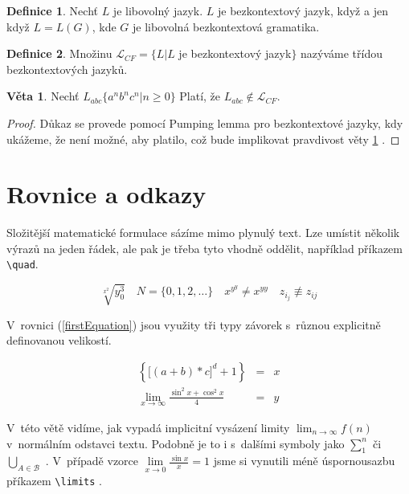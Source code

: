 \documentclass[a4paper, 11pt]{article}
\theoremstyle{definition}
\newtheorem{definition}{Definice}[section]
\theoremstyle{theorem}
\newtheorem{veta}{Věta}
\begin{document}
\begin{definition}
Nechť $L$ je libovolný jazyk. $L$ je bezkontextový jazyk, když a jen když $L=L(G)$, kde $G$ je libovolná bezkontextová gramatika.
\end{definition}

\begin{definition}
Množinu $\mathcal{L}_{CF}=\{L|L$ je bezkontextový jazyk$\}$ nazýváme třídou bezkontextových jazyků.
\end{definition}

\begin{veta}
\label{firstVeta}
Nechť $L_{abc} \{ a^nb^nc^n | n \geq 0 \}$  Platí, že  $L_{abc} \not\in \mathcal{L}_{CF}$.
\end{veta}

\begin{proof}
Důkaz se provede pomocí Pumping lemma pro bezkontextové jazyky, kdy ukážeme, že není možné, aby platilo, což bude implikovat pravdivost věty \ref{firstVeta} .
\end{proof}

\section{Rovnice a odkazy}

Složitější matematické formulace sázíme mimo plynulý text. Lze umístit několik výrazů na jeden řádek, ale pak je třeba tyto vhodně oddělit, například příkazem \verb!\quad!.

$$
\sqrt[x^2]{y_0^3}\quad{N} =\{0,1,2,\ldots\}\quad x^{y^y}\neq x^{yy}\quad z_{i_j}\not\equiv z_{ij}
$$

V~rovnici (\ref{firstEquation}) jsou využity tři typy závorek s~různou explicitně definovanou velikostí.

\begin{eqnarray}
\label{firstEquation}
\left\{\Big[\left(a+b\right)*c\Big]^d+1\right\}&	=&x\\
\lim_{x \rightarrow\infty}\frac{\sin^2x+\cos^2x}{4}&=&y \nonumber
\end{eqnarray}

V~této větě vidíme, jak vypadá implicitní vysázení limity $\lim_{n\rightarrow\infty}f(n)$ v~normálním odstavci textu. Podobně je to i s~dalšími symboly jako $\sum_{1}^{n}$ 
či $\bigcup_{A \in \mathcal{B}}$ . V~případě vzorce $\lim\limits_{x\rightarrow0} \frac{\sin x}{x} = 1$ jsme si vynutili méně úspornou\linebreak sazbu příkazem 
\verb!\limits! .
\end{document}
